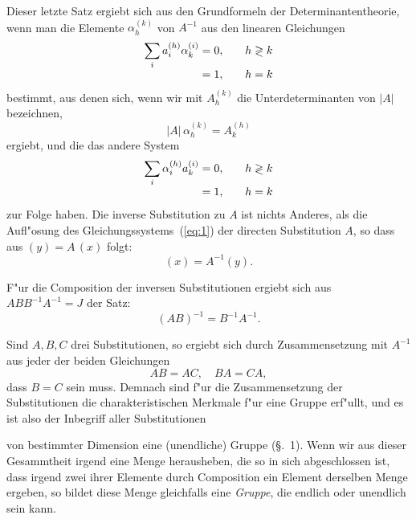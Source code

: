 \documentclass[12pt,a4paper]{article}
\theoremstyle{weber}
\begin{document}
Dieser letzte Satz ergiebt sich aus den Grundformeln der Determinantentheorie, wenn man die Elemente $\alpha_h^{(k)}$ von $A^{-1}$ aus den linearen Gleichungen
\begin{equation}\label{eq:16}
\begin{array}{r@{\;}ll}
\displaystyle\sum_i a_i^{(h)} \alpha_k^{(i)} &= 0, & \quad h \gtrless k \\[4pt]
&= 1, & \quad h = k
\end{array}
\end{equation}
bestimmt, aus denen sich, wenn wir mit $A_h^{(k)}$ die Unterdeterminanten von $|A|$ bezeichnen,
\begin{equation}\label{eq:17}
|A|\, \alpha_h^{(k)} = A_k^{(h)}
\end{equation}
ergiebt, und die das andere System
\begin{equation}\label{eq:18}
\begin{array}{r@{\;}ll}
\displaystyle\sum_i \alpha_i^{(h)} a_k^{(i)} &= 0, & \quad h \gtrless k \\[4pt]
&= 1, & \quad h = k
\end{array}
\end{equation}
zur Folge haben. Die inverse Substitution zu $A$ ist nichts Anderes, als die Aufl"osung des Gleichungssystems~(\ref{eq:1}) der directen Substitution $A$, so dass aus $(y) = A\,(x)$ folgt:
\begin{equation}\label{eq:19}
(x) = A^{-1}(y).
\end{equation}

F"ur die Composition der inversen Substitutionen ergiebt sich aus $ABB^{-1}A^{-1} = J$ der Satz:
\begin{equation}\label{eq:20}
(AB)^{-1} = B^{-1}A^{-1}.
\end{equation}

Sind $A, B, C$ drei Substitutionen, so ergiebt sich durch Zusammensetzung mit $A^{-1}$ aus jeder der beiden Gleichungen
\[
AB = AC,\quad BA = CA,
\]
dass $B = C$ sein muss. Demnach sind f"ur die Zusammensetzung der Substitutionen die charakteristischen Merkmale f"ur eine Gruppe erf"ullt, und es ist also der Inbegriff aller Substitutionen


von bestimmter Dimension eine (unendliche) Gruppe (\S.~1). Wenn wir aus dieser Gesammtheit irgend eine Menge herausheben, die so in sich abgeschlossen ist, dass irgend zwei ihrer Elemente durch Composition ein Element derselben Menge ergeben, so bildet diese Menge gleichfalls eine \textit{Gruppe}, die endlich oder unendlich sein kann.
\end{document}
